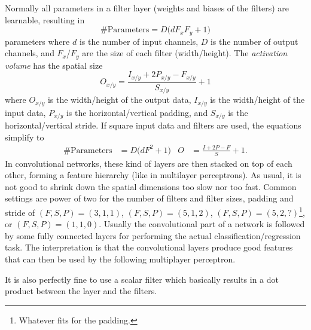 	Normally all parameters in a filter layer (weights and biases of the filters) are learnable, resulting in
	\begin{equation}
		\text{\#Parameters} = D \big( d F_x F_y + 1 \big)
	\end{equation}
	parameters where \(d\) is the number of input channels, \(D\) is the number of output channels, and \(F_x\)/\(F_y\) are the size of each filter (width/height). The \emph{activation volume} has the spatial size
	\begin{equation}
		O_{x/y} = \frac{I_{x/y} + 2 P_{x/y} - F_{x/y}}{S_{x/y}} + 1
	\end{equation}
	where \(O_{x/y}\) is the width/height of the output data, \(I_{x/y}\) is the width/height of the input data, \(P_{x/y}\) is the horizontal/vertical padding, and \(S_{x/y}\) is the horizontal/vertical stride. If square input data and filters are used, the equations simplify to
	\begin{align}
		\text{\#Parameters} &= D \big( d F^2 + 1 \big) &
		O &= \frac{I + 2 P - F}{S} + 1.
	\end{align}
	In convolutional networks, these kind of layers are then stacked on top of each other, forming a feature hierarchy (like in multilayer perceptrons). As usual, it is not good to shrink down the spatial dimensions too slow nor too fast. Common settings are power of two for the number of filters and filter sizes, padding and stride of \( (F, S, P) = (3, 1, 1) \), \( (F, S, P) = (5, 1, 2) \), \( (F, S, P) = (5, 2, ?) \)\footnote{Whatever fits for the padding.}, or \( (F, S, P) = (1, 1, 0) \). Usually the convolutional part of a network is followed by some fully connected layers for performing the actual classification/regression task. The interpretation is that the convolutional layers produce good features that can then be used by the following multiplayer perceptron.

	It is also perfectly fine to use a scalar filter which basically results in a dot product between the layer and the filters.


